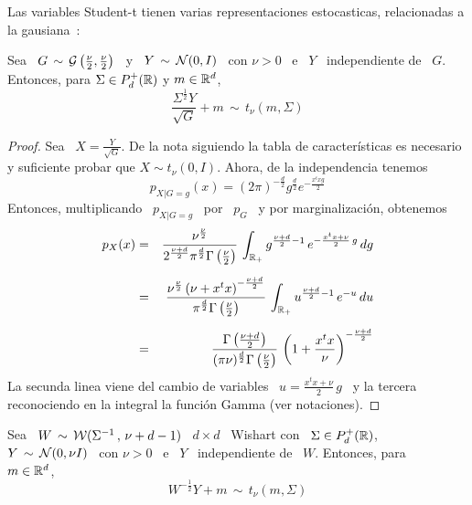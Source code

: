 Las   variables   Student-t   tienen   varias   representaciones   estocasticas,
relacionadas a la gausiana~\cite{FanKot90, And03, KotNad04, AndKau65}:
%
\begin{lema}\label{Lem:MP:StudentGamma}
%
  Sea \ $G \,  \sim \, \mathcal{G}\left( \frac{\nu}{2} , \frac{\nu}{2} \right)$  \ y \ $Y
  \,  \sim  \, \mathcal{N}(0,I)$  \  con  $\nu >  0$  \  e \  $Y$  \  independiente de  \
  $G$. Entonces, para $\Sigma \in P_d^+(\mathbb{R})$ y $m \in \mathbb{R}^d$,
  \[
  \frac{\Sigma^{\frac12} Y}{\sqrt{G}} + m  \, \sim \, t_\nu(m,\Sigma)
  \]
\end{lema}
\begin{proof}
  Sea \ $X = \frac{Y}{\sqrt{G}}$. De la nota siguiendo la tabla de caracter\'isticas
  es  necesario  y suficiente  probar  que $X  \sim  t_\nu(0,I)$.  Ahora, de  la
  independencia tenemos
  \[
  p_{X|G=g}(x)  = (2  \pi)^{-\frac{d}{2}}  g^{\frac{d}{2}} e^{-  \frac{x^t x g}{2}}
  \]
  Entonces, multiplicando \ $p_{X|G=g}$ \ por \ $p_G$ \ y por marginalizaci\'on,
  obtenemos
  \begin{eqnarray*}
  p_X(x) & = & \frac{\nu^{\frac{\nu}{2}}}{2^{\frac{\nu+d}{2}} \pi^{\frac{d}{2}}
  \Gamma\left( \frac{\nu}{2} \right)} \, \int_{\mathbb{R}_+} g^{\frac{\nu+d}{2}-1} \,
  e^{- \frac{x^t x + \nu}{2} \, g} \, dg\\[2mm]
  & = & \frac{\nu^{\frac{\nu}{2}} \left( \nu + x^t x \right)^{-
  \frac{\nu+d}{2}}}{\pi^{\frac{d}{2}} \Gamma\left( \frac{\nu}{2} \right)} \,
  \int_{\mathbb{R}_+} u^{\frac{\nu+d}{2}-1} \, e^{- u} \, du\\[2mm]
  & = & \frac{\Gamma\left( \frac{\nu+d}{2} \right)}{(\pi \nu)^{\frac{d}{2}}
  \Gamma\left( \frac{\nu}{2} \right)} \, \left( 1 + \frac{x^t x}{\nu} \right)^{-
  \frac{\nu+d}{2}}
  \end{eqnarray*}
  La secunda linea viene del cambio de variables \ $u = \frac{x^t x + \nu}{2} \,
  g$  \  y la  tercera  reconociendo  en la  integral  la  funci\'on Gamma  (ver
  notaciones).
\end{proof}
%
\begin{lema}\label{Lem:MP:StudentWishart}
%
  Sea \ $W \, \sim \, \mathcal{W}( \Sigma^{-1} \, , \, \nu+d-1)$ \ $d \times d$ \ Wishart
  con \ $\Sigma \in P_d^+(\mathbb{R})$, \ $Y \,  \sim \, \mathcal{N}(0,\nu I)$ \ con $\nu > 0$
  \ e \ $Y$ \ independiente de \  $W$. Entonces, para \ 
  \ $m \in \mathbb{R}^d$,
  \[
  W^{-\frac12} Y + m \, \sim \, t_\nu\left( m , \Sigma \right)
  \]
\end{lema}
